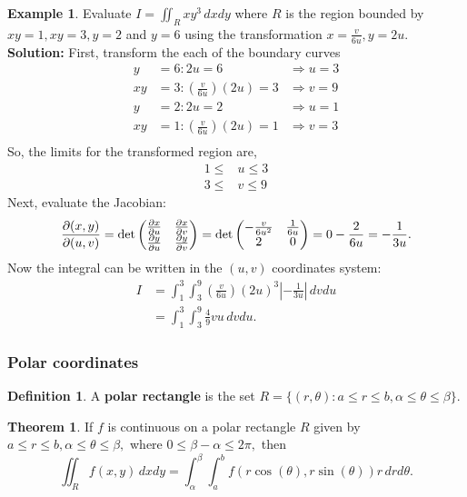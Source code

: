 \documentclass[12pt, a4paper]{article}
\newcommand{\f}[2]{\frac{#1}{#2}}
\newcommand{\imply}{\Rightarrow}
\theoremstyle{definition}
\newtheorem{definition}{Definition}[section]
\newtheorem{theorem}{Theorem}[section]
\newtheorem*{example}{Example}
\theoremstyle{plain}
\begin{document}
\begin{example}
Evaluate $I=\iint_R xy^3 \, dxdy$ where $R$ is the region bounded by $xy=1, xy=3,y=2$ and $y=6$ using the transformation $x=\f{v}{6u},y=2u.$ \\ 
\textbf{Solution:} First, transform the each of the boundary curves $$\begin{aligned}
y&=6: 2u=6 &\imply u=3 \\
xy&=3: \left(\f{v}{6u}\right)(2u)=3 &\imply v=9\\
y&=2: 2u=2 &\imply u=1\\
xy&=1: \left(\f{v}{6u}\right)(2u)=1 &\imply v=3\\
\end{aligned}$$ So, the limits for the transformed region are, $$\begin{aligned}
1\leq &u \leq 3\\
3 \leq &v \leq 9
\end{aligned}$$ Next, evaluate the Jacobian: $$\pdv{(x,y)}{(u,v)}=\det \begin{pmatrix} \pdv{x}{u} & \pdv{x}{v} \\ \pdv{y}{u} & \pdv{y}{v} \end{pmatrix} = \det \begin{pmatrix} -\f{v}{6u^2} & \f{1}{6u} \\ 2 & 0 \end{pmatrix}=0-\f{2}{6u}=-\f{1}{3u}.$$ Now the integral can be written in the $(u,v)$ coordinates system: 
$$\begin{aligned}I&=\int_{1}^{3}\int_{3}^{9}\left(\f{v}{6u}\right)(2u)^3\left|-\f{1}{3u}\right| \, dvdu\\
&= \int_{1}^{3}\int_{3}^{9} \f{4}{9}vu \, dvdu.
\end{aligned}$$
\end{example}

\subsubsection{Polar coordinates}

\begin{definition}
A \textbf{polar rectangle} is the set $R=\{(r,\theta) : a\leq r \leq b, \alpha \leq \theta \leq \beta\}.$
\end{definition}

\begin{theorem}
If $f$ is continuous on a polar rectangle $R$ given by $a\leq r \leq b, \alpha \leq \theta \leq \beta,$ where $0\leq \beta-\alpha\leq 2\pi,$ then $$\iint_R f(x,y) \, dxdy =\int_\alpha^\beta\int_a^b f(r\cos(\theta),r\sin(\theta)) r  \,drd\theta.$$
\end{theorem}
\end{document}
